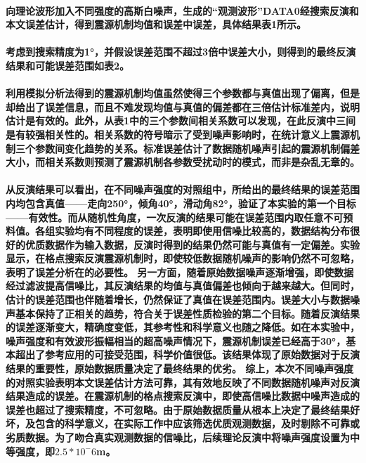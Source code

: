 \documentclass[a4paper,12pt,single,pdftex]{scrartcl}
\begin{document}
\label{ID_828329485}\paragraph{向理论波形加入不同强度的高斯白噪声，生成的“观测波形”DATA0经搜索反演和本文误差估计，得到震源机制均值和误差中误差，具体结果表1所示。}

\label{ID_146486423}\paragraph{考虑到搜索精度为1°，并假设误差范围不超过3倍中误差大小，则得到的最终反演结果和可能误差范围如表2。}

\label{ID_543795542}\paragraph{利用模拟分析法得到的震源机制均值虽然使得三个参数都与真值出现了偏离，但是却给出了误差信息，而且不难发现均值与真值的偏差都在三倍估计标准差内，说明估计是有效的。此外，从表1中的三个参数间相关系数可以发现，在此反演中三间是有较强相关性的。相关系数的符号暗示了受到噪声影响时，在统计意义上震源机制三个参数间变化趋势的关系。标准误差估计了数据随机噪声引起的震源机制偏差大小，而相关系数则预测了震源机制各参数受扰动时的模式，而非是杂乱无章的。}

\label{ID_849692593}\paragraph{从反演结果可以看出，在不同噪声强度的对照组中，所给出的最终结果的误差范围内均包含真值——走向250°，倾角40°，滑动角82°，验证了本实验的第一个目标——有效性。而从随机性角度，一次反演的结果可能在误差范围内取任意不可预料值。各组实验均有不同程度的误差，表明即使用信噪比较高的，数据结构分布很好的优质数据作为输入数据，反演时得到的结果仍然可能与真值有一定偏差。实验显示，在格点搜索反演震源机制时，即使较低数据随机噪声的影响仍然不可忽略，表明了误差分析在的必要性。
另一方面，随着原始数据噪声逐渐增强，即使数据经过滤波提高信噪比，其反演结果的均值与真值偏差也倾向于越来越大。但同时，估计的误差范围也伴随着增长，仍然保证了真值在误差范围内。误差大小与数据噪声基本保持了正相关的趋势，符合关于误差性质检验的第二个目标。随着反演结果的误差逐渐变大，精确度变低，其参考性和科学意义也随之降低。如在本实验中，噪声强度和有效波形振幅相当的超高噪声情况下，震源机制误差已经高于30°，基本超出了参考应用的可接受范围，科学价值很低。该结果体现了原始数据对于反演结果的重要性，原始数据质量决定了最终结果的优劣。
综上，本次不同噪声强度的对照实验表明本文误差估计方法可靠，其有效地反映了不同数据随机噪声对反演结果造成的误差。在震源机制的格点搜索反演中，即使高信噪比数据中噪声造成的误差也超过了搜索精度，不可忽略。由于原始数据质量从根本上决定了最终结果好坏，及包含的科学意义，在实际工作中应该筛选优质观测数据，及时剔除不可靠或劣质数据。为了吻合真实观测数据的信噪比，后续理论反演中将噪声强度设置为中等强度，即$2.5*10^-6$m。}
\end{document}
